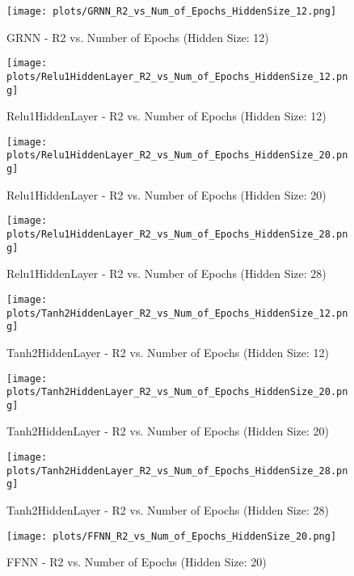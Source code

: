 \begin{figure}[H]
    \centering
    \texttt{[image: plots/GRNN\_R2\_vs\_Num\_of\_Epochs\_HiddenSize\_12.png]}
    \caption{GRNN - R2 vs. Number of Epochs (Hidden Size: 12)}
\end{figure}

\begin{figure}[H]
    \centering
    \texttt{[image: plots/Relu1HiddenLayer\_R2\_vs\_Num\_of\_Epochs\_HiddenSize\_12.png]}
    \caption{Relu1HiddenLayer - R2 vs. Number of Epochs (Hidden Size: 12)}
\end{figure}

\begin{figure}[H]
    \centering
    \texttt{[image: plots/Relu1HiddenLayer\_R2\_vs\_Num\_of\_Epochs\_HiddenSize\_20.png]}
    \caption{Relu1HiddenLayer - R2 vs. Number of Epochs (Hidden Size: 20)}
\end{figure}

\begin{figure}[H]
    \centering
    \texttt{[image: plots/Relu1HiddenLayer\_R2\_vs\_Num\_of\_Epochs\_HiddenSize\_28.png]}
    \caption{Relu1HiddenLayer - R2 vs. Number of Epochs (Hidden Size: 28)}
\end{figure}

\begin{figure}[H]
    \centering
    \texttt{[image: plots/Tanh2HiddenLayer\_R2\_vs\_Num\_of\_Epochs\_HiddenSize\_12.png]}
    \caption{Tanh2HiddenLayer - R2 vs. Number of Epochs (Hidden Size: 12)}
\end{figure}

\begin{figure}[H]
    \centering
    \texttt{[image: plots/Tanh2HiddenLayer\_R2\_vs\_Num\_of\_Epochs\_HiddenSize\_20.png]}
    \caption{Tanh2HiddenLayer - R2 vs. Number of Epochs (Hidden Size: 20)}
\end{figure}

\begin{figure}[H]
    \centering
    \texttt{[image: plots/Tanh2HiddenLayer\_R2\_vs\_Num\_of\_Epochs\_HiddenSize\_28.png]}
    \caption{Tanh2HiddenLayer - R2 vs. Number of Epochs (Hidden Size: 28)}
\end{figure}

\begin{figure}[H]
    \centering
    \texttt{[image: plots/FFNN\_R2\_vs\_Num\_of\_Epochs\_HiddenSize\_20.png]}
    \caption{FFNN - R2 vs. Number of Epochs (Hidden Size: 20)}
\end{figure}

